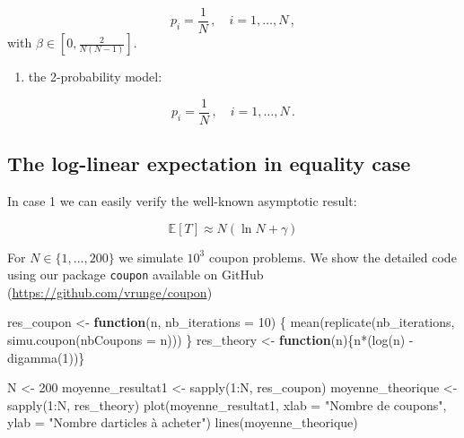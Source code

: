 \documentclass[
]{article}
\newenvironment{Shaded}{\begin{snugshade}}{\end{snugshade}}
\newcommand{\AttributeTok}[1]{\textcolor[rgb]{0.77,0.63,0.00}{#1}}
\newcommand{\ControlFlowTok}[1]{\textcolor[rgb]{0.13,0.29,0.53}{\textbf{#1}}}
\newcommand{\DecValTok}[1]{\textcolor[rgb]{0.00,0.00,0.81}{#1}}
\newcommand{\FunctionTok}[1]{\textcolor[rgb]{0.00,0.00,0.00}{#1}}
\newcommand{\NormalTok}[1]{#1}
\newcommand{\OtherTok}[1]{\textcolor[rgb]{0.56,0.35,0.01}{#1}}
\newcommand{\SpecialCharTok}[1]{\textcolor[rgb]{0.00,0.00,0.00}{#1}}
\newcommand{\StringTok}[1]{\textcolor[rgb]{0.31,0.60,0.02}{#1}}
\providecommand{\tightlist}{%
  \setlength{\itemsep}{0pt}\setlength{\parskip}{0pt}}
\begin{document}
\[p_i = \frac{1}{N}\,,\quad i = 1,\ldots, N\,,\] with
\(\beta \in [0, \frac{2}{N(N-1)}]\).

\begin{enumerate}
\def\labelenumi{\arabic{enumi}.}
\setcounter{enumi}{2}
\tightlist
\item
  the 2-probability model:
\end{enumerate}

\[p_i = \frac{1}{N}\,,\quad i = 1,\ldots, N\,.\]

\hypertarget{the-log-linear-expectation-in-equality-case}{%
\subsection{The log-linear expectation in equality
case}\label{the-log-linear-expectation-in-equality-case}}

In case 1 we can easily verify the well-known asymptotic result:

\[\mathbb E [T] \approx N(\ln N + \gamma)\]

For \(N \in \{1,...,200\}\) we simulate \(10^3\) coupon problems. We
show the detailed code using our package \texttt{coupon} available on
GitHub (\url{https://github.com/vrunge/coupon})

\begin{Shaded}
\begin{Highlighting}[]
\NormalTok{res\_coupon }\OtherTok{\textless{}{-}} \ControlFlowTok{function}\NormalTok{(n, }\AttributeTok{nb\_iterations =} \DecValTok{10}\NormalTok{)}
\NormalTok{\{}
  \FunctionTok{mean}\NormalTok{(}\FunctionTok{replicate}\NormalTok{(nb\_iterations, }\FunctionTok{simu.coupon}\NormalTok{(}\AttributeTok{nbCoupons =}\NormalTok{ n)))}
\NormalTok{\}}
\NormalTok{res\_theory }\OtherTok{\textless{}{-}} \ControlFlowTok{function}\NormalTok{(n)\{n}\SpecialCharTok{*}\NormalTok{(}\FunctionTok{log}\NormalTok{(n) }\SpecialCharTok{{-}} \FunctionTok{digamma}\NormalTok{(}\DecValTok{1}\NormalTok{))\}}

\NormalTok{N }\OtherTok{\textless{}{-}} \DecValTok{200}
\NormalTok{moyenne\_resultat1 }\OtherTok{\textless{}{-}} \FunctionTok{sapply}\NormalTok{(}\DecValTok{1}\SpecialCharTok{:}\NormalTok{N, res\_coupon)}
\NormalTok{moyenne\_theorique }\OtherTok{\textless{}{-}} \FunctionTok{sapply}\NormalTok{(}\DecValTok{1}\SpecialCharTok{:}\NormalTok{N, res\_theory)}
\FunctionTok{plot}\NormalTok{(moyenne\_resultat1, }\AttributeTok{xlab =} \StringTok{"Nombre de coupons"}\NormalTok{, }\AttributeTok{ylab =} \StringTok{"Nombre d\textquotesingle{}articles à acheter"}\NormalTok{)}
\FunctionTok{lines}\NormalTok{(moyenne\_theorique)}
\end{Highlighting}
\end{Shaded}
\end{document}
